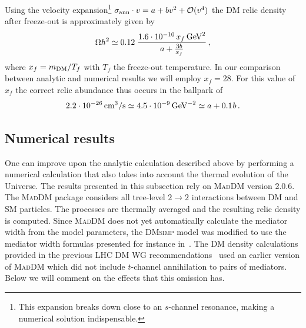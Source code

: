 \documentclass[a4paper, 11pt,notoc]{article}
\newcommand{\dmsimp}{\textsc{DMsimp}\xspace}
\newcommand{\maddm}{\textsc{MadDM}\xspace}
\begin{document}
Using the velocity expansion\footnote{This expansion breaks down close to an $s$-channel resonance, 
making a numerical solution indispensable.}  $\sigma_{\rm ann} \cdot v = a + b v^2 + {\cal O} (v^4)$ the DM relic density  after freeze-out is approximately given by
\begin{equation}
    \Omega h^2 \simeq 0.12 \; \frac{1.6 \cdot 10^{-10} \, x_f \, {\rm GeV}^2}{a + \frac{3b}{x_f}} \,,
\end{equation}
where $x_f = m_{\rm DM}/T_f$ with $T_f$ the freeze-out temperature. In our comparison between analytic and numerical results we will employ $x_f = 28$. For this value of $x_f$ the correct relic abundance thus occurs in the ballpark of
\begin{equation}
2.2 \cdot 10^{-26} \, {\rm cm}^3/{\rm s} \simeq 4.5 \cdot 10^{-9} \, {\rm GeV}^{-2} \simeq a + 0.1 \hspace{0.25mm} b \,.
\end{equation}

\subsection{Numerical results}
\label{numericrelic}

One can improve upon the analytic calculation described above by performing a numerical calculation 
that also takes into account the thermal evolution of the Universe. The results presented in this subsection rely on \maddm version 2.0.6.  The \maddm package considers all tree-level $2\rightarrow2$ interactions between DM and SM particles. The processes are thermally averaged and the resulting relic density is computed.
Since \maddm does not yet automatically calculate the mediator width from the model parameters, the \dmsimp model was modified to use the mediator width formulas presented for instance in~\cite{Abercrombie:2015wmb,Boveia:2016mrp}. 
The DM density calculations provided in the previous LHC DM WG recommendations~\cite{Boveia:2016mrp} 
used an earlier version of \maddm which did not include  $t$-channel annihilation to pairs of mediators. Below we will comment on the effects that this omission has.  
\end{document}
